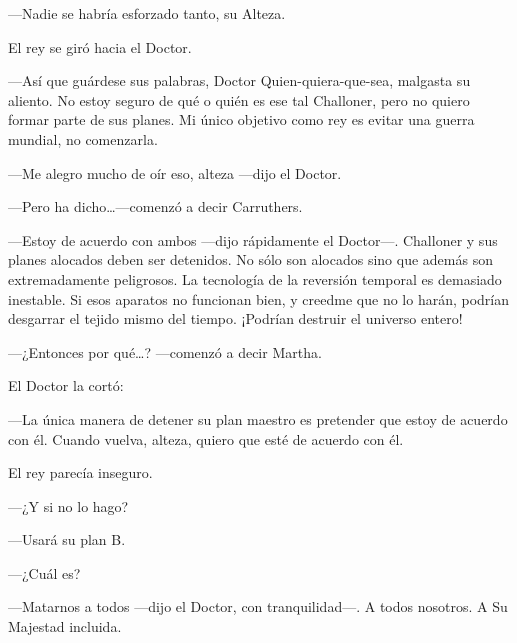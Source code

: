 ---Nadie se habría esforzado tanto, su Alteza.

El rey se giró hacia el Doctor.

---Así que guárdese sus palabras, Doctor Quien-quiera-que-sea, malgasta
su aliento. No estoy seguro de qué o quién es ese tal Challoner, pero no
quiero formar parte de sus planes. Mi único objetivo como rey es evitar
una guerra mundial, no comenzarla.

---Me alegro mucho de oír eso, alteza ---dijo el Doctor.

---Pero ha dicho\ldots{}---comenzó a decir Carruthers.

---Estoy de acuerdo con ambos ---dijo rápidamente el Doctor---.
Challoner y sus planes alocados deben ser detenidos. No sólo son
alocados sino que además son extremadamente peligrosos. La tecnología de
la reversión temporal es demasiado inestable. Si esos aparatos no
funcionan bien, y creedme que no lo harán, podrían desgarrar el tejido
mismo del tiempo. ¡Podrían destruir el universo entero!

---¿Entonces por qué\ldots{}? ---comenzó a decir Martha.

El Doctor la cortó:

---La única manera de detener su plan maestro es pretender que estoy de
acuerdo con él. Cuando vuelva, alteza, quiero que esté de acuerdo con
él.

El rey parecía inseguro.

---¿Y si no lo hago?

---Usará su plan B.

---¿Cuál es?

---Matarnos a todos ---dijo el Doctor, con tranquilidad---. A todos
nosotros. A Su Majestad incluida.
